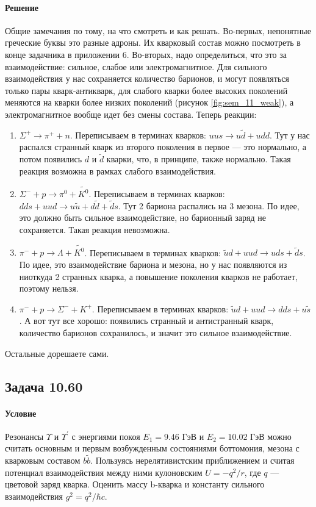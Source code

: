\documentclass[12pt]{article}
\begin{document}
\paragraph{Решение}
Общие замечания по тому, на что смотреть и как решать. Во-первых, непонятные греческие буквы это разные адроны. Их кварковый состав можно посмотреть в конце задачника в приложении 6. Во-вторых, надо определиться, что это за взаимодействие: сильное, слабое или электромагнитное. Для сильного взаимодействия у нас сохраняется количество барионов, и могут появляться только пары кварк-антикварк, для слабого кварки более высоких поколений меняются на кварки более низких поколений (рисунок \ref{fig:sem_11_weak}), а электромагнитное вообще идет без смены состава. Теперь реакции:
\begin{enumerate}
    \item $\Sigma^+ \rightarrow \pi^+ + n$. Переписываем в терминах кварков: $uus \rightarrow u\widetilde{d} + udd$. Тут у нас распался странный кварк из второго поколения в первое --- это нормально, а потом появились $d$ и $\widetilde{d}$ кварки, что, в принципе, также нормально. Такая реакция возможна в рамках слабого взаимодействия.
    \item $\Sigma^- + p\rightarrow \pi^0 + \widetilde{K^0}$. Переписываем в терминах кварков: $dds + uud \rightarrow u\widetilde{u} + d\widetilde{d} + \widetilde{d}s$. Тут 2 бариона распались на 3 мезона. По идее, это должно быть сильное взаимодействие, но барионный заряд не сохраняется. Такая реакция невозможна.
    \item $\pi^- + p \rightarrow \Lambda + \widetilde{K^0}$. Переписываем в терминах кварков: $ \widetilde{u}d + uud \rightarrow uds + \widetilde{d}s$. По идее, это взаимодействие бариона и мезона, но у нас появляются из ниоткуда 2 странных кварка, а повышение поколения кварков не работает, поэтому нельзя.
    \item $\pi^- + p \rightarrow \Sigma^- + K^+$. Переписываем в терминах кварков: $ \widetilde{u}d + uud \rightarrow dds + u\widetilde{s}$. А вот тут все хорошо: появились странный и антистранный кварк, количество барионов сохранилось, и значит это сильное взаимодействие.
\end{enumerate}
Остальные дорешаете сами.

\subsection{Задача 10.60}
\label{task_10.60}
\paragraph{Условие}
Резонансы $\Upsilon$ и $\Upsilon^{'}$ с энергиями покоя $E_1 = 9.46$ ГэВ и $E_2 = 10.02$ ГэВ можно считать основным и первым возбужденным состояниями боттомония, мезона с кварковым составом $b\widetilde{b}$. Пользуясь нерелятивистским приближением и считая потенциал взаимодействия между ними кулоновским $U=-q^2/r$, где $q$ --- цветовой заряд кварка. Оценить массу b-кварка и константу сильного взаимодействия $g^2=q^2/\hbar c$.
\end{document}
